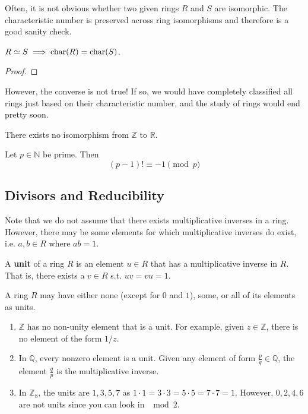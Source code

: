   Often, it is not obvious whether two given rings $R$ and $S$ are isomorphic. The characteristic number is preserved across ring isomorphisms and therefore is a good sanity check. 

  \begin{theorem}
    $R \simeq S \implies \Char(R) = \Char(S)$. 
  \end{theorem}
  \begin{proof}

  \end{proof}

  However, the converse is not true! If so, we would have completely classified all rings just based on their characteristic number, and the study of rings would end pretty soon. 

  \begin{example}
    There exists no isomorphism from $\mathbb{Z}$ to $\mathbb{R}$. 
  \end{example}

  \begin{theorem}
    Let $p \in \mathbb{N}$ be prime. Then 
    \begin{equation}
      (p-1)! \equiv -1 \pmod{p}
    \end{equation}
  \end{theorem}
  
\subsection{Divisors and Reducibility} 

  Note that we do not assume that there exists multiplicative inverses in a ring. However, there may be some elements for which multiplicative inverses do exist, i.e. $a, b \in R$ where $ab = 1$. 

  \begin{definition}[Unit]
    A \textbf{unit} of a ring $R$ is an element $u \in R$ that has a multiplicative inverse in $R$. That is, there exists a $v \in R$ s.t. $uv = vu = 1$. 
  \end{definition}

  \begin{example}
    A ring $R$ may have either none (except for $0$ and $1$), some, or all of its elements as units. 
    \begin{enumerate}
      \item $\mathbb{Z}$ has no non-unity element that is a unit. For example, given $z \in \mathbb{Z}$, there is no element of the form $1/z$.  
      \item In $\mathbb{Q}$, every nonzero element is a unit. Given any element of form $\frac{p}{q} \in \mathbb{Q}$, the element $\frac{q}{p}$ is the multiplicative inverse. 
      \item In $\mathbb{Z}_8$, the units are $1, 3, 5, 7$ as $1 \cdot 1 = 3 \cdot 3 = 5 \cdot 5 = 7 \cdot 7 = 1$. However, $0, 2, 4, 6$ are not units since you can look in $\mod{2}$. 
    \end{enumerate}
  \end{example}

